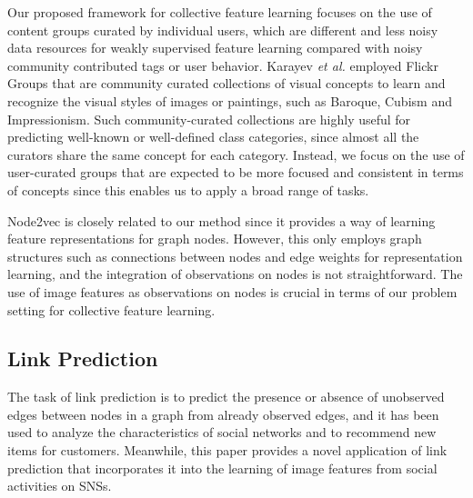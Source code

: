 \documentclass[letterpaper]{article} %
\def\etal{\emph{et al.}}
\begin{document}
Our proposed framework for collective feature learning focuses on the use of content groups curated by individual users, which are different and less noisy data resources for weakly supervised feature learning compared with noisy community contributed tags or user behavior.
%
Karayev \etal \cite{Karayev2014} employed Flickr Groups that are community curated collections of visual concepts to learn and recognize the visual styles of images or paintings, such as Baroque, Cubism and Impressionism.
%
Such community-curated collections are highly useful for predicting well-known or well-defined class categories, since almost all the curators share the same concept for each category.
%
Instead, we focus on the use of user-curated groups that are expected to be more focused and consistent in terms of concepts since this enables us to apply a broad range of tasks.

Node2vec \cite{Grover2016} is closely related to our method since it provides a way of learning feature representations for graph nodes.
%
However, this only employs graph structures such as connections between nodes and edge weights for representation learning, and the integration of observations on nodes is not straightforward.
%
The use of image features as observations on nodes is crucial in terms of our problem setting for collective feature learning.

\subsection{Link Prediction}
\label{sec:related:link}
\indent

The task of link prediction is to predict the presence or absence of unobserved edges between nodes in a graph from already observed edges, and it has been used to analyze the characteristics of social networks and to recommend new items for customers.
%
Meanwhile, this paper provides a novel application of link prediction that incorporates it into the learning of image features from social activities on SNSs.
\end{document}
